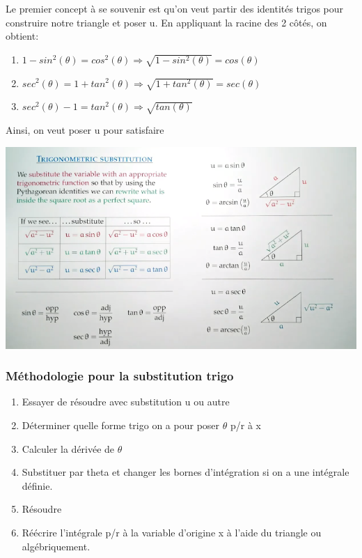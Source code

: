 \documentclass{article}
\begin{document}
Le premier concept à se souvenir est qu'on veut partir des identités trigos
pour construire notre triangle et poser u. En appliquant la racine des 2
côtés, on obtient:
\begin{enumerate}
    \item $ 1-sin^2(\theta) = cos^2(\theta) \Longrightarrow
	\sqrt{1-sin^2(\theta)} = cos(\theta)$
    \item $ sec^2(\theta) = 1 + tan^2(\theta) \Longrightarrow
	\sqrt{1+tan^2(\theta)} = sec(\theta)$
    \item $ sec^2(\theta) - 1 = tan^2(\theta) \Longrightarrow
	\sqrt{tan(\theta)}$
\end{enumerate}

Ainsi, on veut poser u pour satisfaire

\includegraphics{trigonometric_substitution_butler}

\subsubsection{Méthodologie pour la substitution trigo}%
\label{ssub:}

\begin{enumerate}
    \item Essayer de résoudre avec substitution u ou autre
    \item Déterminer quelle forme trigo on a pour poser $\theta$
	p/r à x
    \item Calculer la dérivée de $\theta$
    \item Substituer par theta et changer les bornes d'intégration si on
	a une intégrale définie.
    \item Résoudre
    \item Réécrire l'intégrale p/r à la variable d'origine x à l'aide du
	triangle ou algébriquement.
\end{enumerate}
\end{document}
